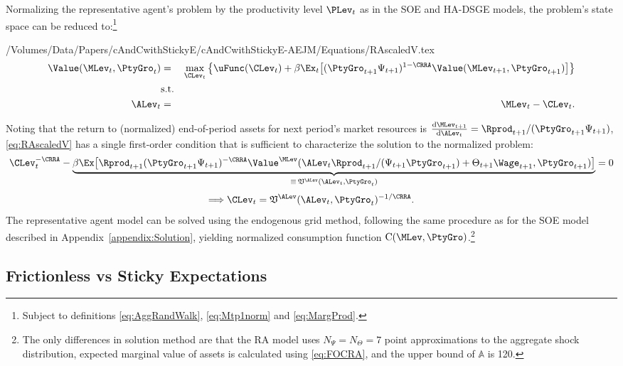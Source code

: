 Normalizing the representative agent's problem by the productivity level $\PLev_t$ as in
the SOE and HA-DSGE models, the problem's state space can be reduced to:\footnote{Subject to definitions \eqref{eq:AggRandWalk}, \eqref{eq:Mtp1norm} and \eqref{eq:MargProd}.}
\begin{verbatimwrite}{/Volumes/Data/Papers/cAndCwithStickyE/cAndCwithStickyE-AEJM/Equations/RAscaledV.tex}
\begin{eqnarray}
   \Value(\MLev_{t},\PtyGro_t) & = & \max_{\CLev_{t}} \big\{ \uFunc(\CLev_{t}) + \beta \Ex_{t} \big[ (\PtyGro_{t+1}\Psi_{t+1})^{1-\CRRA} \Value(\MLev_{t+1},\PtyGro_{t+1}) \big] \big\} \label{eq:RAscaledV}  
\\  & \mbox{s.t.} & \nonumber
\\   \ALev_{t} & = & \MLev_{t}-\CLev_{t}. \nonumber
\end{eqnarray}
\end{verbatimwrite}

Noting that the return to (normalized) end-of-period assets for next period's
market resources is
$\frac{\text{d}\MLev_{t+1}}{\text{d} \ALev_{t}} = \Rprod_{t+1}/(\PtyGro_{t+1}\Psi_{t+1})$,
\eqref{eq:RAscaledV} has a single first-order condition that is sufficient
to characterize the solution to the normalized problem:
\begin{equation}\label{eq:FOCRA}
\CLev_t^{-\CRRA} - \underbrace{\beta \Ex \big[\Rprod_{t+1} (\PtyGro_{t+1}\Psi_{t+1})^{-\CRRA} \Value^\MLev(\ALev_{t} \Rprod_{t+1}/(\Psi_{t+1} \PtyGro_{t+1}) + \Theta_{t+1} \Wage_{t+1}, \PtyGro_{t+1})  \big]}_{\equiv\, \mathfrak{V}^\ALev(\ALev_t,\PtyGro_t)} = 0
\end{equation}
\begin{equation*}
\Longrightarrow \CLev_t = \mathfrak{V}^\ALev(\ALev_t,\PtyGro_t)^{-1/\CRRA}.
\end{equation*}
The representative agent model can be solved using the endogenous grid method,
following the same procedure as for the SOE model described in Appendix~\ref{appendix:Solution}, yielding
 normalized consumption function $\text{C}(\MLev,\PtyGro)$.\footnote{The only
differences in solution method are that the RA model uses $N_\Psi=N_\Theta=7$ point
approximations to the aggregate shock distribution, expected marginal value of assets
is calculated using \eqref{eq:FOCRA}, and the upper bound of $\mathbb{A}$ is 120.}


\subsection{Frictionless vs Sticky Expectations}

